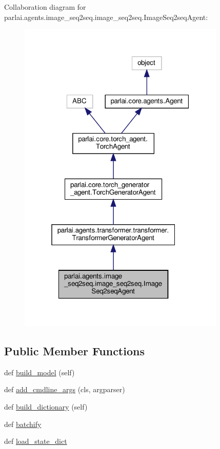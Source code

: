 Collaboration diagram for parlai.\+agents.\+image\+\_\+seq2seq.\+image\+\_\+seq2seq.\+Image\+Seq2seq\+Agent\+:
\nopagebreak
\begin{figure}[H]
\begin{center}
\leavevmode
\includegraphics[width=280pt]{d1/d1e/classparlai_1_1agents_1_1image__seq2seq_1_1image__seq2seq_1_1ImageSeq2seqAgent__coll__graph}
\end{center}
\end{figure}
\subsection*{Public Member Functions}
\begin{DoxyCompactItemize}
\item 
def \hyperlink{classparlai_1_1agents_1_1image__seq2seq_1_1image__seq2seq_1_1ImageSeq2seqAgent_a57153a1ef2941b32bad39d72e5a05c7d}{build\+\_\+model} (self)
\item 
def \hyperlink{classparlai_1_1agents_1_1image__seq2seq_1_1image__seq2seq_1_1ImageSeq2seqAgent_a78d8fe5aa1f336ee6a96bcdb4adb0e70}{add\+\_\+cmdline\+\_\+args} (cls, argparser)
\item 
def \hyperlink{classparlai_1_1agents_1_1image__seq2seq_1_1image__seq2seq_1_1ImageSeq2seqAgent_ae440ea7d71b21f103f44fdf9e9f48432}{build\+\_\+dictionary} (self)
\item 
def \hyperlink{classparlai_1_1agents_1_1image__seq2seq_1_1image__seq2seq_1_1ImageSeq2seqAgent_a7dc7e180dd0c0ca30f1ab04e0b54c481}{batchify}
\item 
def \hyperlink{classparlai_1_1agents_1_1image__seq2seq_1_1image__seq2seq_1_1ImageSeq2seqAgent_ad39de2ed722157ff5756b28c37ab9205}{load\+\_\+state\+\_\+dict}
\end{DoxyCompactItemize}
